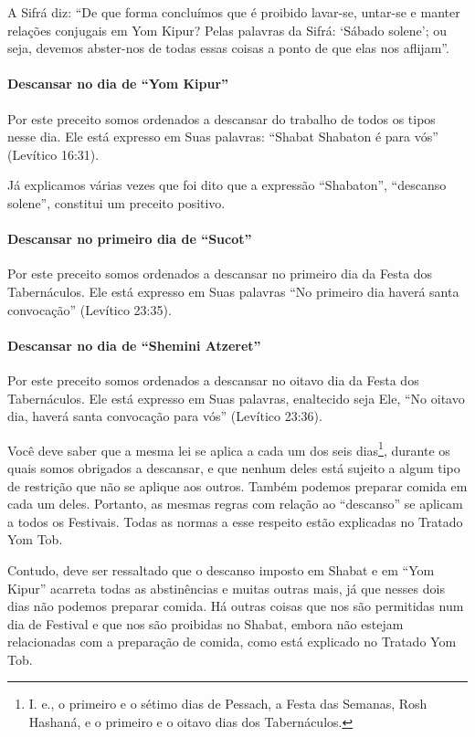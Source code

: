 A Sifrá diz: ``De que forma concluímos que é proibido lavar-se, untar-se
e manter relações conjugais em Yom Kipur? Pelas palavras da Sifrá:
`Sábado solene'; ou seja, devemos abster-nos de todas essas coisas a
ponto de que elas nos aflijam''.

\paragraph{Descansar no dia de ``Yom Kipur''}

Por este preceito somos ordenados a descansar do trabalho de todos os
tipos nesse dia. Ele está expresso em Suas palavras: ``Shabat Shabaton é
para vós'' (Levítico 16:31).

Já explicamos várias vezes que foi dito que a expressão ``Shabaton'',
``descanso solene'', constitui um preceito positivo.

\paragraph{Descansar no primeiro dia de ``Sucot''}

Por este preceito somos ordenados a descansar no primeiro dia da Festa
dos Tabernáculos. Ele está expresso em Suas palavras ``No primeiro dia
haverá santa convocação'' (Levítico 23:35).

\paragraph{Descansar no dia de ``Shemini Atzeret''}

Por este preceito somos ordenados a descansar no oitavo dia da Festa
dos Tabernáculos. Ele está expresso em Suas palavras, enaltecido seja
Ele, ``No oitavo dia, haverá santa convocação para vós'' (Levítico 23:36).

Você deve saber que a mesma lei se aplica a cada um dos seis
dias\footnote{I. e., o primeiro e o sétimo dias de Pessach, a Festa das
Semanas, Rosh Hashaná, e o primeiro e o oitavo dias dos Tabernáculos.}, durante os quais somos obrigados a
descansar, e que nenhum deles está sujeito a algum tipo de restrição que não se aplique aos outros. Também podemos preparar comida em cada um deles. Portanto, as mesmas regras com relação ao ``descanso'' se aplicam a todos os Festivais. Todas as normas a esse
respeito estão explicadas no Tratado Yom Tob.

Contudo, deve ser ressaltado que o descanso imposto em Shabat e em ``Yom
Kipur'' acarreta todas as abstinências e muitas outras mais, já que
nesses dois dias não podemos preparar comida. Há outras coisas que nos
são permitidas num dia de Festival e que nos são proibidas no Shabat,
embora não estejam relacionadas com a preparação de comida, como está
explicado no Tratado Yom Tob.

